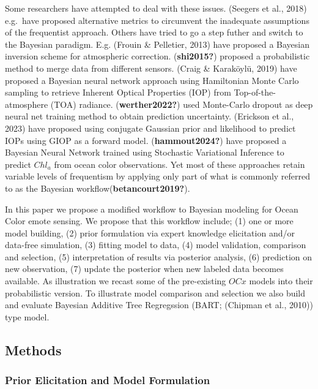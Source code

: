 \documentclass[
]{agujournal2019}
\begin{document}
Some researchers have attempted to deal with these issues. (Seegers et
al., 2018) e.g.~have proposed alternative metrics to circumvent the
inadequate assumptions of the frequentist approach. Others have tried to
go a step futher and switch to the Bayesian paradigm. E.g. (Frouin \&
Pelletier, 2013) have proposed a Bayesian inversion scheme for
atmospheric correction. (\textbf{shi2015?}) proposed a probabilistic
method to merge data from different sensors. (Craig \& Karaköylü, 2019)
have proposed a Bayesian neural network approach using Hamiltonian Monte
Carlo sampling to retrieve Inherent Optical Properties (IOP) from
Top-of-the-atmosphere (TOA) radiance. (\textbf{werther2022?}) used
Monte-Carlo dropout as deep neural net training method to obtain
prediction uncertainty. (Erickson et al., 2023) have proposed using
conjugate Gaussian prior and likelihood to predict IOPs using GIOP as a
forward model. (\textbf{hammout2024?}) have proposed a Bayesian Neural
Network trained using Stochastic Variational Inference to predict
\(Chl_a\) from ocean color observations. Yet most of these approaches
retain variable levels of frequentism by applying only part of what is
commonly referred to as the Bayesian workflow(\textbf{betancourt2019?}).

In this paper we propose a modified workflow to Bayesian modeling for
Ocean Color emote sensing. We propose that this workflow include; (1)
one or more model building, (2) prior formulation via expert knowledge
elicitation and/or data-free simulation, (3) fitting model to data, (4)
model validation, comparison and selection, (5) interpretation of
results via posterior analysis, (6) prediction on new observation, (7)
update the posterior when new labeled data becomes available. As
illustration we recast some of the pre-existing \(OCx\) models into
their probabilistic version. To illustrate model comparison and
selection we also build and evaluate Bayesian Additive Tree Regregssion
(BART; (Chipman et al., 2010)) type model.

\subsection{Methods}\label{methods}

\subsubsection{Prior Elicitation and Model
Formulation}\label{prior-elicitation-and-model-formulation}
\end{document}
